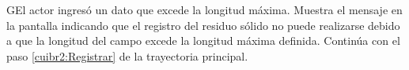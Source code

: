             \begin{UCtrayectoriaA}{G}{El actor ingresó un dato que excede la longitud máxima.}    
    \UCpaso[\UCsist] Muestra el mensaje  en la pantalla  indicando que el registro del residuo sólido no puede realizarse debido a que la longitud del campo excede la longitud máxima definida.
    \UCpaso[] Continúa con el paso \ref{cuibr2:Registrar} de la trayectoria principal.     
    \end{UCtrayectoriaA}
